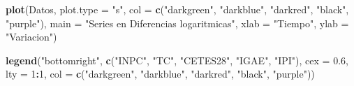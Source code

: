 \documentclass[
]{book}
\newenvironment{Shaded}{\begin{snugshade}}{\end{snugshade}}
\newcommand{\AttributeTok}[1]{\textcolor[rgb]{0.13,0.29,0.53}{#1}}
\newcommand{\DecValTok}[1]{\textcolor[rgb]{0.00,0.00,0.81}{#1}}
\newcommand{\FloatTok}[1]{\textcolor[rgb]{0.00,0.00,0.81}{#1}}
\newcommand{\FunctionTok}[1]{\textcolor[rgb]{0.13,0.29,0.53}{\textbf{#1}}}
\newcommand{\NormalTok}[1]{#1}
\newcommand{\OtherTok}[1]{\textcolor[rgb]{0.56,0.35,0.01}{#1}}
\newcommand{\SpecialCharTok}[1]{\textcolor[rgb]{0.81,0.36,0.00}{\textbf{#1}}}
\newcommand{\StringTok}[1]{\textcolor[rgb]{0.31,0.60,0.02}{#1}}
\begin{document}
\begin{Shaded}
\end{Shaded}

\begin{Shaded}
\begin{Highlighting}[]
\FunctionTok{plot}\NormalTok{(Datos, }\AttributeTok{plot.type =} \StringTok{"s"}\NormalTok{, }
     \AttributeTok{col =} \FunctionTok{c}\NormalTok{(}\StringTok{"darkgreen"}\NormalTok{, }\StringTok{"darkblue"}\NormalTok{, }\StringTok{"darkred"}\NormalTok{, }\StringTok{"black"}\NormalTok{, }\StringTok{"purple"}\NormalTok{), }
     \AttributeTok{main =} \StringTok{"Series en Diferencias logaritmicas"}\NormalTok{, }
     \AttributeTok{xlab =} \StringTok{"Tiempo"}\NormalTok{, }\AttributeTok{ylab =} \StringTok{"Variacion"}\NormalTok{)}

\FunctionTok{legend}\NormalTok{(}\StringTok{"bottomright"}\NormalTok{, }\FunctionTok{c}\NormalTok{(}\StringTok{"INPC"}\NormalTok{, }\StringTok{"TC"}\NormalTok{, }\StringTok{"CETES28"}\NormalTok{, }\StringTok{"IGAE"}\NormalTok{, }\StringTok{"IPI"}\NormalTok{),}
       \AttributeTok{cex =} \FloatTok{0.6}\NormalTok{, }\AttributeTok{lty =} \DecValTok{1}\SpecialCharTok{:}\DecValTok{1}\NormalTok{, }
       \AttributeTok{col =} \FunctionTok{c}\NormalTok{(}\StringTok{"darkgreen"}\NormalTok{, }\StringTok{"darkblue"}\NormalTok{, }\StringTok{"darkred"}\NormalTok{, }\StringTok{"black"}\NormalTok{, }\StringTok{"purple"}\NormalTok{))}
\end{Highlighting}
\end{Shaded}
\end{document}
